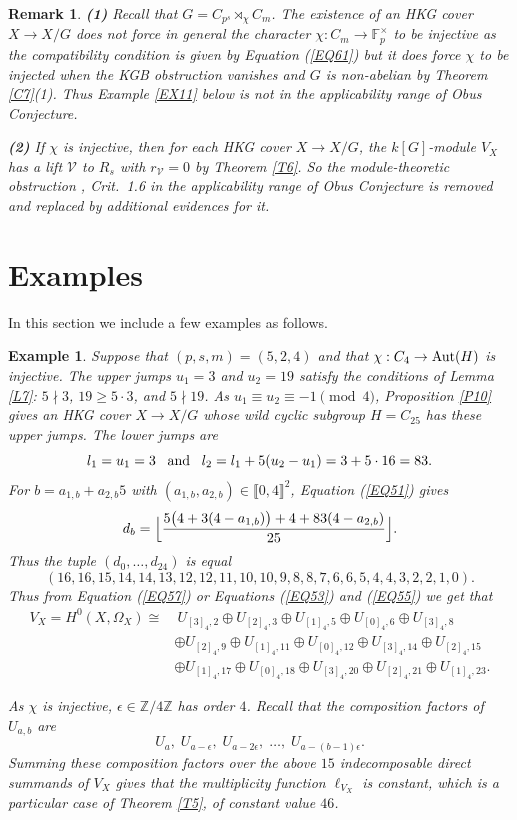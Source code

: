 \documentclass[11pt]{amsart}
\newtheorem{ex}[theorem]{Example}
\newtheorem{remark}[theorem]{Remark}
\def\Aut{\textup{Aut}}
\begin{document}
\begin{remark}\normalfont\label{R6}
{\bf (1)} Recall that $G=C_{p^s}\rtimes_{\chi} C_m$. The existence of an HKG cover $X\rightarrow X/G$ does not force in general the character $\chi:C_m\rightarrow\mathbb F_p^{\times}$ to be injective as the compatibility condition is given by Equation (\ref{EQ61}) but it does force $\chi$ to be injected when the KGB obstruction vanishes and $G$ is non-abelian by Theorem \ref{C7}(1). Thus Example \ref{EX11} below is not in the applicability range of Obus Conjecture.

\smallskip
{\bf (2)} If $\chi$ is injective, then for each HKG cover $X\rightarrow X/G$, the $k[G]$-module $V_X$ has a lift $\mathcal V$ to $R_s$ with $r_{\mathcal V}=0$ by Theorem \ref{T6}. So the module-theoretic obstruction \cite{KT2}, Crit.\ 1.6 in the applicability range of Obus Conjecture is removed and replaced by additional evidences for it.
\end{remark}

\section{Examples}\label{S14}

In this section we include a few examples as follows. 

\begin{ex}\normalfont\label{EX10}
Suppose that $(p,s,m)=(5,2,4)$ and that $\chi:C_4\rightarrow \Aut(H)$ is injective. The upper jumps $u_1=3$ and $u_2=19$ satisfy the conditions of Lemma \ref{L7}: $5\nmid 3$, $19\ge 5\cdot 3$, and $5\nmid 19$. As $u_1\equiv u_2\equiv -1\pmod 4$, Proposition \ref{P10} gives an HKG cover $X\rightarrow X/G$ whose wild cyclic subgroup $H=C_{25}$ has these upper jumps.
The lower jumps are
$$l_1=u_1=3\;\;\;\textup{and}\;\;\;l_2=l_1+5(u_2-u_1)=3+5\cdot 16=83.$$
For $b=a_{1,b}+a_{2,b}5$ with $(a_{1,b},a_{2,b})\in\llbracket0,4\rrbracket^2$, Equation (\ref{EQ51}) gives
$$d_b=\Bigl\lfloor \frac{5\bigl(4+3(4-a_{1,b})\bigr)+4+83(4-a_{2,b})}{25}\Bigr\rfloor.$$
Thus the tuple $(d_0,\ldots,d_{24})$ is equal
$$(16, 16, 15, 14, 14, 13, 12, 12, 11, 10, 10, 9, 8, 8, 7, 6, 6, 5, 4, 4, 3, 2, 2, 1, 0).$$
Thus from Equation (\ref{EQ57}) or Equations (\ref{EQ53}) and (\ref{EQ55}) we get that
\begin{align*}
V_X=H^0(X,\Omega_X)\cong &\ U_{[3]_4,2}\oplus U_{[2]_4,3}\oplus U_{[1]_4,5}\oplus U_{[0]_4,6}\oplus U_{[3]_4,8}\\
&\oplus U_{[2]_4,9}\oplus U_{[1]_4,11}\oplus U_{[0]_4,12}\oplus U_{[3]_4,14}\oplus U_{[2]_4,15}\\
&\oplus U_{[1]_4,17}\oplus U_{[0]_4,18}\oplus U_{[3]_4,20}\oplus U_{[2]_4,21}\oplus U_{[1]_4,23}.
\end{align*}

As $\chi$ is injective, $\epsilon\in\mathbb Z/4\mathbb Z$ has order $4$. Recall that the composition factors of $U_{a,b}$ are
$$U_a,\;U_{a-\epsilon},\;U_{a-2\epsilon},\;\ldots,\;U_{a-(b-1)\epsilon}.$$
Summing these composition factors over the above $15$ indecomposable direct summands of $V_X$ gives that the multiplicity function $\ell_{V_X}$ is constant, which is a particular case of Theorem \ref{T5}, of constant value $46$.
\end{ex}
\end{document}
